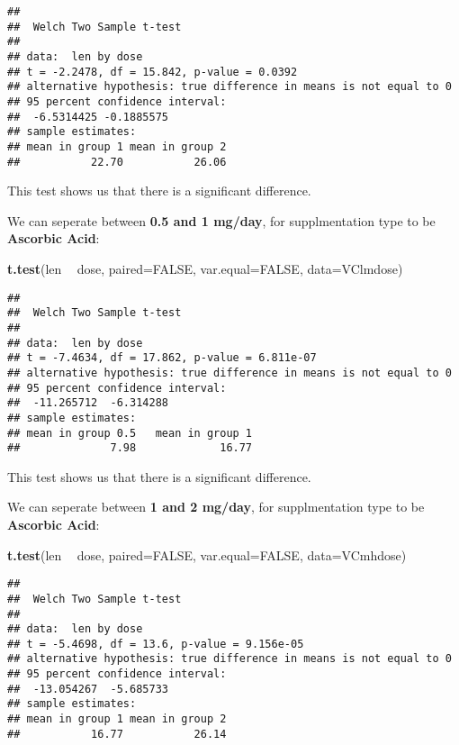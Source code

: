 \documentclass[]{article}
\newenvironment{Shaded}{\begin{snugshade}}{\end{snugshade}}
\newcommand{\DataTypeTok}[1]{\textcolor[rgb]{0.13,0.29,0.53}{#1}}
\newcommand{\KeywordTok}[1]{\textcolor[rgb]{0.13,0.29,0.53}{\textbf{#1}}}
\newcommand{\NormalTok}[1]{#1}
\newcommand{\OperatorTok}[1]{\textcolor[rgb]{0.81,0.36,0.00}{\textbf{#1}}}
\newcommand{\OtherTok}[1]{\textcolor[rgb]{0.56,0.35,0.01}{#1}}
\newcommand{\StringTok}[1]{\textcolor[rgb]{0.31,0.60,0.02}{#1}}
\begin{document}
\begin{verbatim}
## 
##  Welch Two Sample t-test
## 
## data:  len by dose
## t = -2.2478, df = 15.842, p-value = 0.0392
## alternative hypothesis: true difference in means is not equal to 0
## 95 percent confidence interval:
##  -6.5314425 -0.1885575
## sample estimates:
## mean in group 1 mean in group 2 
##           22.70           26.06
\end{verbatim}

This test shows us that there is a significant difference.

We can seperate between \textbf{0.5 and 1 mg/day}, for supplmentation
type to be \textbf{Ascorbic Acid}:

\begin{Shaded}
\begin{Highlighting}[]
\KeywordTok{t.test}\NormalTok{(len }\OperatorTok{~}\StringTok{ }\NormalTok{dose, }\DataTypeTok{paired=}\OtherTok{FALSE}\NormalTok{, }\DataTypeTok{var.equal=}\OtherTok{FALSE}\NormalTok{, }\DataTypeTok{data=}\NormalTok{VClmdose)}
\end{Highlighting}
\end{Shaded}

\begin{verbatim}
## 
##  Welch Two Sample t-test
## 
## data:  len by dose
## t = -7.4634, df = 17.862, p-value = 6.811e-07
## alternative hypothesis: true difference in means is not equal to 0
## 95 percent confidence interval:
##  -11.265712  -6.314288
## sample estimates:
## mean in group 0.5   mean in group 1 
##              7.98             16.77
\end{verbatim}

This test shows us that there is a significant difference.

We can seperate between \textbf{1 and 2 mg/day}, for supplmentation type
to be \textbf{Ascorbic Acid}:

\begin{Shaded}
\begin{Highlighting}[]
\KeywordTok{t.test}\NormalTok{(len }\OperatorTok{~}\StringTok{ }\NormalTok{dose, }\DataTypeTok{paired=}\OtherTok{FALSE}\NormalTok{, }\DataTypeTok{var.equal=}\OtherTok{FALSE}\NormalTok{, }\DataTypeTok{data=}\NormalTok{VCmhdose)}
\end{Highlighting}
\end{Shaded}

\begin{verbatim}
## 
##  Welch Two Sample t-test
## 
## data:  len by dose
## t = -5.4698, df = 13.6, p-value = 9.156e-05
## alternative hypothesis: true difference in means is not equal to 0
## 95 percent confidence interval:
##  -13.054267  -5.685733
## sample estimates:
## mean in group 1 mean in group 2 
##           16.77           26.14
\end{verbatim}
\end{document}
